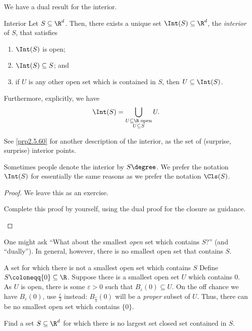 We have a dual result for the interior.
\begin{prp}{Interior}{}
Let $S\subseteq \R ^d$.  Then, there exists a unique set $\Int (S)\subseteq \R ^d$, the \emph{interior} of $S$, that satisfies
\begin{enumerate}
\item $\Int (S)$ is open;
\item $\Int (S)\subseteq S$; and
\item if $U$ is any other open set which is contained in $S$, then $U\subseteq \Int (S)$.
\end{enumerate}
Furthermore, explicitly, we have
\begin{equation}
\Int (S)=\bigcup _{\substack{U\subseteq \R \text{ open} \\ U\subseteq S}}U.
\end{equation}
\begin{rmk}
See \cref{prp2.5.60} for another description of the interior, as the set of (surprise, surprise) interior points.
\end{rmk}
\begin{rmk}
Sometimes people denote the interior by $S\degree$.  We prefer the notation $\Int (S)$ for essentially the same reasons as we prefer the notation $\Cls (S)$.
\end{rmk}
\begin{proof}
We leave this as an exercise.
\begin{exr}[breakable=false]{}{}
Complete this proof by yourself, using the dual proof for the closure as guidance.
\end{exr}
\end{proof}
\end{prp}
One might ask ``What about the smallest \emph{open} set which contains $S$?'' (and ``dually'').  In general, however, there is no smallest open set that contains $S$.
\begin{exm}{A set for which there is not a smallest open set which contains $S$}{}
Define $S\coloneqq \{ 0\} \subseteq \R$.  Suppose there is a smallest open set $U$ which contains $0$.  As $U$ is open, there is some $\varepsilon >0$ such that $B_{\varepsilon}(0)\subseteq U$.  On the off chance we have $B_{\varepsilon}(0)$, use $\frac{\varepsilon}{2}$ instead:  $B_{\frac{\varepsilon}{2}}(0)$ will be a \emph{proper} subset of $U$.  Thus, there can be no smallest open set which contains $\{ 0\}$.
\end{exm}
\begin{exr}{}{}
Find a set $S\subseteq \R ^d$ for which there is no largest set closed set contained in $S$.
\end{exr}

